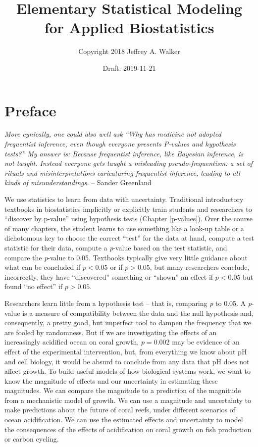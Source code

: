 \documentclass[]{book}
\title{Elementary Statistical Modeling for Applied Biostatistics}
\author{Copyright 2018 Jeffrey A. Walker}
\date{Draft: 2019-11-21}
\begin{document}
\maketitle

{
\setcounter{tocdepth}{1}
\tableofcontents
}
\chapter*{Preface}\label{preface}

\emph{More cynically, one could also well ask ``Why has medicine not
adopted frequentist inference, even though everyone presents P-values
and hypothesis tests?'' My answer is: Because frequentist inference,
like Bayesian inference, is not taught. Instead everyone gets taught a
misleading pseudo-frequentism: a set of rituals and misinterpretations
caricaturing frequentist inference, leading to all kinds of
misunderstandings.} -- Sander Greenland

We use statistics to learn from data with uncertainty. Traditional
introductory textbooks in biostatistics implicitly or explicitly train
students and researchers to ``discover by p-value'' using hypothesis
tests (Chapter \ref{p-values}). Over the course of many chapters, the
student learns to use something like a look-up table or a dichotomous
key to choose the correct ``test'' for the data at hand, compute a test
statistic for their data, compute a \emph{p}-value based on the test
statistic, and compare the \emph{p}-value to 0.05. Textbooks typically
give very little guidance about what can be concluded if \(p < 0.05\) or
if \(p > 0.05\), but many researchers conclude, incorrectly, they have
``discovered'' something or ``shown'' an effect if \(p < 0.05\) but
found ``no effect'' if \(p > 0.05\).

Researchers learn little from a hypothesis test -- that is, comparing
\emph{p} to 0.05. A \emph{p}-value is a measure of compatibility between
the data and the null hypothesis and, consequently, a pretty good, but
imperfect tool to dampen the frequency that we are fooled by randomness.
But if we are investigating the effects of an increasingly acidified
ocean on coral growth, \(p=0.002\) may be evidence of an effect of the
experimental intervention, but, from everything we know about pH and
cell biology, it would be absurd to conclude from any data that pH does
not affect growth. To build useful models of how biological systems
work, we want to know the magnitude of effects and our uncertainty in
estimating these magnitudes. We can compare the magnitude to a
prediction of the magnitude from a mechanistic model of growth. We can
use a magnitude and uncertainty to make predictions about the future of
coral reefs, under different scenarios of ocean acidification. We can
use the estimated effects and uncertainty to model the consequences of
the effects of acidification on coral growth on fish production or
carbon cycling.
\end{document}
